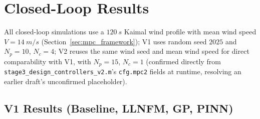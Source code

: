 
\section{Closed-Loop Results}
\label{sec:closed_loop_results}

All closed-loop simulations use a $\SI{120}{s}$ Kaimal wind profile with
mean wind speed $V=\SI{14}{m/s}$ (Section~\ref{sec:mpc_framework}); V1 uses
random seed $2025$ and $N_p=10$, $N_c=4$; V2 reuses the same wind seed and
mean wind speed for direct comparability with V1, with
$N_p=15$, $N_c=1$ (confirmed directly from
\texttt{stage3\_design\_controllers\_v2.m}'s \texttt{cfg.mpc2} fields at
runtime, resolving an earlier draft's unconfirmed placeholder).

\subsection{V1 Results (Baseline, LLNFM, GP, PINN)}
\label{subsec:v1_results}

